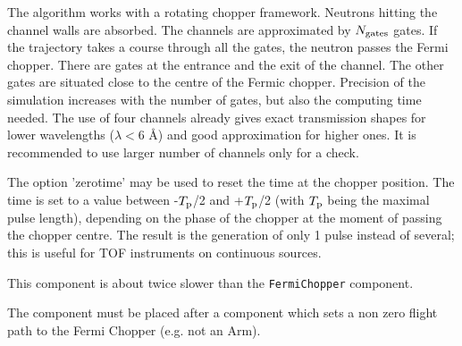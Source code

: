 The algorithm works with a rotating chopper framework. Neutrons hitting the channel
walls are absorbed. The channels are approximated by $N_{\rm gates}$ gates. If the trajectory
takes a course through all the gates, the neutron passes the Fermi chopper. There are gates at
the entrance and the exit of the channel. The other gates are situated close to the centre of
the Fermic chopper.
Precision of the simulation increases with the number of gates, but also the computing time needed.
The use of four channels already gives exact transmission shapes for lower wavelengths
($\lambda < 6$ \AA) and good approximation for higher ones. It is recommended to use larger number of
channels only for a check.

The option 'zerotime' may be used to reset the time at the chopper position. The time is
set to a value between -$T_{\rm p}$/2 and +$T_{\rm p}$/2 (with $T_{\rm p}$ being the maximal pulse length),
depending on the phase of the chopper at the moment of passing the chopper centre. The
result is the generation of only 1 pulse instead of several; this is useful for TOF instruments
on continuous sources.

This component is about twice slower than the \verb+FermiChopper+ component.

The component must be placed after a component which sets a non zero flight path to the Fermi Chopper (e.g. not an Arm).